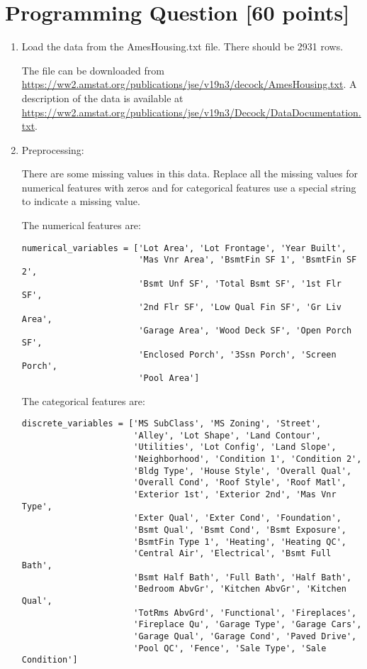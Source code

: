 \documentclass[letterpaper]{article}
\begin{document}
\section{Programming Question [60 points]}

\begin{enumerate}

\item Load the data from the AmesHousing.txt file. There should be 2931 rows.

The file can be downloaded from \url{https://ww2.amstat.org/publications/jse/v19n3/decock/AmesHousing.txt}. A description of the data
is available at \url{https://ww2.amstat.org/publications/jse/v19n3/Decock/DataDocumentation.txt}.

\item Preprocessing: 

There are some missing values in this data. Replace all the missing values for numerical features with zeros and for categorical features use a special string to indicate a missing value.

The numerical features are:

\begin{verbatim}
numerical_variables = ['Lot Area', 'Lot Frontage', 'Year Built',
                       'Mas Vnr Area', 'BsmtFin SF 1', 'BsmtFin SF 2',
                       'Bsmt Unf SF', 'Total Bsmt SF', '1st Flr SF',
                       '2nd Flr SF', 'Low Qual Fin SF', 'Gr Liv Area',
                       'Garage Area', 'Wood Deck SF', 'Open Porch SF', 
                       'Enclosed Porch', '3Ssn Porch', 'Screen Porch',
                       'Pool Area']
\end{verbatim}

The categorical features are:

\begin{verbatim}
discrete_variables = ['MS SubClass', 'MS Zoning', 'Street',
                      'Alley', 'Lot Shape', 'Land Contour',
                      'Utilities', 'Lot Config', 'Land Slope',
                      'Neighborhood', 'Condition 1', 'Condition 2',
                      'Bldg Type', 'House Style', 'Overall Qual',
                      'Overall Cond', 'Roof Style', 'Roof Matl',
                      'Exterior 1st', 'Exterior 2nd', 'Mas Vnr Type',
                      'Exter Qual', 'Exter Cond', 'Foundation', 
                      'Bsmt Qual', 'Bsmt Cond', 'Bsmt Exposure',
                      'BsmtFin Type 1', 'Heating', 'Heating QC',
                      'Central Air', 'Electrical', 'Bsmt Full Bath', 
                      'Bsmt Half Bath', 'Full Bath', 'Half Bath', 
                      'Bedroom AbvGr', 'Kitchen AbvGr', 'Kitchen Qual',
                      'TotRms AbvGrd', 'Functional', 'Fireplaces',
                      'Fireplace Qu', 'Garage Type', 'Garage Cars',
                      'Garage Qual', 'Garage Cond', 'Paved Drive',
                      'Pool QC', 'Fence', 'Sale Type', 'Sale Condition']
\end{verbatim}


\end{enumerate}
\end{document}
